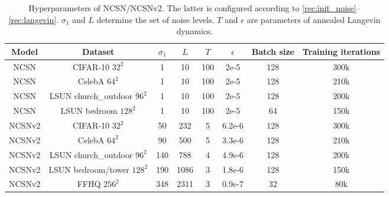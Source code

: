 \documentclass{article}
\begin{document}
\begin{table}[H]
    \vspace{-1.2em}
    \caption{Hyperparameters of NCSN/NCSNv2. The latter is configured according to \cref{rec:init_noise}--\ref{rec:langevin}. $\sigma_1$ and $L$ determine the set of noise levels. $T$ and $\epsilon$ are parameters of annealed Langevin dynamics.}\label{tab:hyperparameters}
    \begin{center}
    \begin{adjustbox}{max width=\linewidth}
    \begin{tabular}{cccccccc}
    \toprule
    Model & Dataset & $\sigma_1$ & $L$ & $T$ & $\epsilon$ & Batch size & Training iterations\\ 
    \midrule
    NCSN & CIFAR-10 $32^2$ & 1 & 10 &  100 & 2e-5 & 128 & 300k\\
    NCSN & CelebA $64^2$ & 1 & 10 &  100 & 2e-5 & 128 & 210k\\
    NCSN & LSUN church\_outdoor $96^2$ & 1 & 10 & 100 & 2e-5 & 128 & 200k\\
    NCSN & LSUN bedroom $128^2$ & 1 & 10 & 100 & 2e-5 & 64 & 150k\\
    NCSNv2 & CIFAR-10 $32^2$ & 50 & 232 & 5 & 6.2e-6 & 128 & 300k\\
    NCSNv2 & CelebA $64^2$ & 90 & 500 & 5 & 3.3e-6 & 128 & 210k\\
    NCSNv2 & LSUN church\_outdoor $96^2$ & 140 & 788 & 4 & 4.9e-6 & 128 & 200k\\
    NCSNv2 & LSUN bedroom/tower $128^2$ & 190 & 1086 & 3 & 1.8e-6 & 128 & 150k\\
    NCSNv2 & FFHQ $256^2$ & 348 & 2311 & 3 & 0.9e-7 & 32 & 80k\\
    \bottomrule
    \end{tabular}
    \end{adjustbox}
    \end{center}
\end{table}
\end{document}
